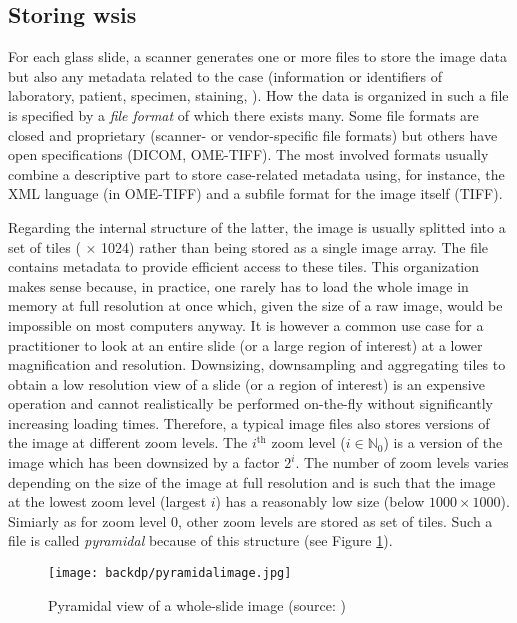 \subsection{Storing \acrshort{wsi}s}
\label{ssec:backdp:storingviewing}

For each glass slide, a scanner generates one or more files to store the image data but also any metadata related to the case (information or identifiers of laboratory, patient, specimen, staining, \etc). How the data is organized in such a file is specified by a \textit{file format} of which there exists many. Some file formats are closed and proprietary (\eg scanner- or vendor-specific file formats) but others have open specifications (\eg DICOM, OME-TIFF). The most involved formats usually combine a descriptive part to store case-related metadata using, for instance, the XML language (\eg in OME-TIFF) and a subfile format for the image itself (\eg TIFF). 

Regarding the internal structure of the latter, the image is usually splitted into a set of tiles ( $\times$ 1024) rather than being stored as a single image array. The file contains metadata to provide efficient access to these tiles. This organization makes sense because, in practice, one rarely has to load the whole image in memory at full resolution at once which, given the size of a raw image, would be impossible on most computers anyway. It is however a common use case for a practitioner to look at an entire slide (or a large region of interest) at a lower magnification and resolution. Downsizing, downsampling and aggregating tiles to obtain a low resolution view of a slide (or a region of interest) is an expensive operation and cannot realistically be performed on-the-fly without significantly increasing loading times. Therefore, a typical image files also stores versions of the image at different zoom levels. The $i^{\text{th}}$ zoom level ($i \in \mathbb{N}_0$) is a version of the image which has been downsized by a factor $2^i$. The number of zoom levels varies depending on the size of the image at full resolution and is such that the image at the lowest zoom level (\ie largest $i$) has a reasonably low size (\eg below $1000 \times 1000$). Simiarly as for zoom level 0, other zoom levels are stored as set of tiles. Such a file is called \textit{pyramidal} because of this structure (see Figure \ref{fig:backdp:pyramidalimage}).

\begin{figure}
  \centering
  \texttt{[image: backdp/pyramidalimage.jpg]}
  \caption{Pyramidal view of a whole-slide image (source: \parencite{marini2022multi_scale_tools})}
  \label{fig:backdp:pyramidalimage}
\end{figure}

